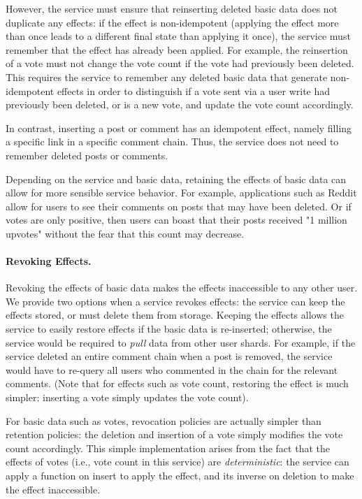 \documentclass[letterpaper,twocolumn,10pt]{article}
\begin{document}
However, the service must ensure that reinserting deleted basic data does not duplicate any effects: if the effect is non-idempotent (applying the effect more than once leads to a different final state than applying it once), the service must remember that the effect has already been applied.
For example, the reinsertion of a vote must not change the vote count if the vote had previously been deleted.
This requires the service to remember any deleted basic data that generate non-idempotent effects in order to distinguish if a vote sent via a user write had previously been deleted, or is a new vote, and update the vote count accordingly.

In contrast, inserting a post or comment has an idempotent effect, namely filling a specific link in a specific comment chain. Thus, the service does not need to remember deleted posts or comments.

Depending on the service and basic data, retaining the effects of basic data can allow for more sensible service behavior. For example, applications such as 
Reddit allow for users to see their comments on posts that may have been deleted.
Or if votes are only positive, then users can boast that their posts received "1 million upvotes" without the fear that this count may decrease.

\paragraph{Revoking Effects.}
Revoking the effects of basic data makes the effects inaccessible to any other user. 
We provide two options when a service revokes effects: the service can keep the effects stored, or must delete them from storage.
Keeping the effects allows the service to easily restore effects if the basic data is re-inserted; otherwise, the service would be required to \emph{pull} data from other user shards. 
For example, if the service deleted an entire comment chain when a post is removed, the service 
would have to re-query all users who commented in the chain for the relevant comments.
(Note that for effects such as vote count, restoring the effect is much simpler: inserting a vote simply updates the vote count).

For basic data such as votes, revocation policies are actually simpler than retention policies: 
the deletion and insertion of a vote simply modifies the vote count accordingly.
This simple implementation arises from the fact that the effects of votes (i.e., vote count in this service) are \emph{deterministic}: 
the service can apply a function on insert to apply the effect, and its inverse on deletion to make the effect inaccessible.
\end{document}
